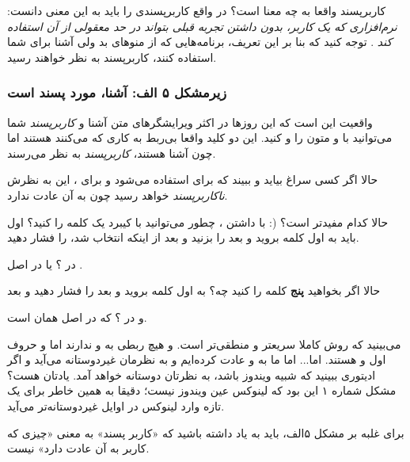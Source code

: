 کاربرپسند واقعا به چه معنا است؟ در واقع کاربرپسندی را باید به این معنی دانست:
\emph{نرم‌افزاری که یک کاربر، بدون داشتن تجربه قبلی بتواند در حد معقولی از آن استفاده کند}
. توجه کنید که بنا بر این تعریف، برنامه‌هایی که از منوهای بد ولی آشنا برای شما استفاده کنند، کاربرپسند به نظر خواهند رسید.
\subsubsection*{زیرمشکل ۵ الف: آشنا، مورد پسند است}
واقعیت این است که این روزها در اکثر ویرایشگرهای متن آشنا و
\emph{کاربرپسند}
شما می‌توانید با 
 و 
 متون را 
 و 
 کنید. این‌ دو کلید واقعا بی‌ربط به کاری که می‌کنند هستند اما چون آشنا هستند،
\emph{کاربرپسند}
به نظر می‌رسند.

حالا اگر کسی سراغ 
بیاید و ببیند که 
برای 
 استفاده می‌شود و 
برای 
، این به نظرش
\emph{ناکاربرپسند}
خواهد رسید چون به آن عادت ندارد.

حالا کدام مفیدتر است؟ 
(:
با داشتن 
، چطور می‌توانید با کیبرد یک کلمه را 
 کنید؟ اول باید به اول کلمه بروید و بعد 
 را بزنید و بعد از اینکه انتخاب شد، 
 را فشار دهید.

در 
؟ 
یا در اصل 
.

حالا اگر بخواهید
\textbf{پنج}
کلمه را 
 کنید چه؟ به اول کلمه بروید و بعد 
 را فشار دهید و بعد
\begin{mybox}
\flushleft
{}









\end{mybox}
و در 
؟ 
 که در اصل همان 
 است.

می‌بینید که روش 
کاملا سریعتر و منطقی‌تر است. 
و 
هیچ ربطی به 
 و 
ندارند اما 
و 
حروف اول 
 و 
 هستند. اما... اما ما به 
و 
عادت کرده‌ایم و 
به نظرمان غیردوستانه می‌آید و اگر ادیتوری ببینید که شبیه ویندوز باشد، به نظرتان دوستانه خواهد‌ آمد. یادتان هست؟‌ مشکل شماره ۱ این بود که لینوکس عین ویندوز نیست؛ دقیقا به همین خاطر برای یک تازه وارد لینوکس در اوایل غیردوستانه‌تر می‌آید.

برای غلبه بر مشکل ۵الف، باید به یاد داشته باشید که «کاربر پسند» به معنی «چیزی که کاربر به آن عادت دارد» نیست.

